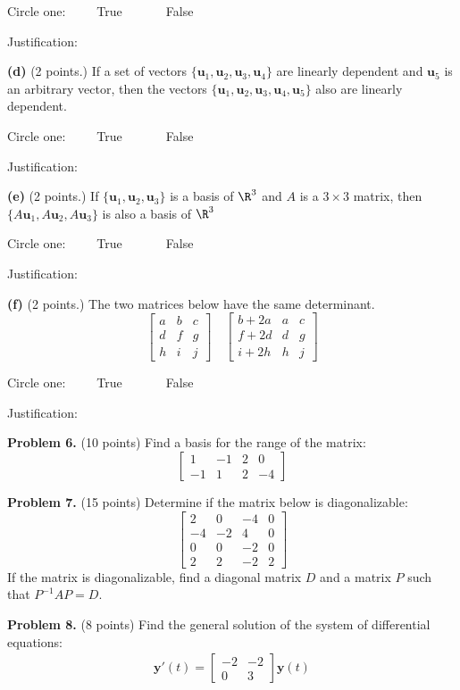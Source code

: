 \documentclass[12pt]{article}
\begin{document}
Circle one:\ \ \ \ \  True\ \ \ \ \ \ \ False

Justification:

\vfill
\clearpage

\textbf{(d)} (2 points.) If a set of vectors $\{\mathbf{u}_1,\mathbf{u}_2,\mathbf{u}_3,\mathbf{u}_4\}$ are linearly dependent and $\mathbf{u}_5$ is an arbitrary vector, then the vectors  $\{\mathbf{u}_1,\mathbf{u}_2,\mathbf{u}_3,\mathbf{u}_4,\mathbf{u}_5\}$ also are linearly dependent.

Circle one:\ \ \ \ \  True\ \ \ \ \ \ \ False

Justification:
\vfill

\textbf{(e)} (2 points.) If $\{\mathbf{u}_1, \mathbf{u}_2, \mathbf{u}_3\}$ is a basis of $\R^3$ and $A$ is a $3\times 3$ matrix, then $\{A\mathbf{u}_1, A\mathbf{u}_2, A\mathbf{u}_3\}$ is also a basis of $\R^3$

Circle one:\ \ \ \ \  True\ \ \ \ \ \ \ False

Justification:
\vfill

\textbf{(f)} (2 points.) The two matrices below have the same determinant.
\[
\begin{bmatrix}a&b&c\\d&f&g\\h&i&j\end{bmatrix}\quad
\begin{bmatrix}b+2a&a&c\\f+2d&d&g\\i+2h&h&j\end{bmatrix}
\]

Circle one:\ \ \ \ \  True\ \ \ \ \ \ \ False

Justification:
\vfill
\clearpage

\textbf{Problem 6.} (10 points) Find a basis for the range of the matrix:
\[
\left[\begin{matrix}1 & -1 & 2 & 0\\-1 & 1 & 2 & -4\end{matrix}\right]
\]
\clearpage

\textbf{Problem 7.} (15 points) Determine if the matrix below is diagonalizable:
\[
\left[\begin{matrix}2 & 0 & -4 & 0\\-4 & -2 & 4 & 0\\0 & 0 & -2 & 0\\2 & 2 & -2 & 2\end{matrix}\right]
\]
If the matrix is diagonalizable, find a diagonal matrix $D$ and a matrix $P$ such that $P^{-1}AP=D$.

\clearpage

\textbf{Problem 8.} (8 points) Find the general solution of the system of differential equations:
\begin{align*}
\mathbf{y}'(t)=
\begin{bmatrix}-2&-2\\0&3\end{bmatrix}\mathbf{y}(t)
\end{align*}
\end{document}
